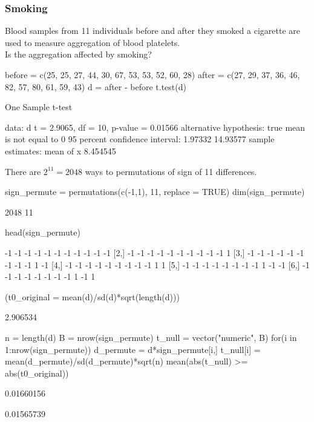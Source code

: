 \documentclass[a4paper]{article}
\begin{document}
\subsubsection{Smoking}
Blood samples from 11 individuals before and after they smoked a cigarette are used to measure aggregation of blood platelets.\\
Is the aggregation affected by smoking?
\begin{Schunk}
\begin{Sinput}
before = c(25, 25, 27, 44, 30, 67, 53, 53, 52, 60, 28)
after =  c(27, 29, 37, 36, 46, 82, 57, 80, 61, 59, 43)  
d = after - before
t.test(d)
\end{Sinput}
\begin{Soutput}

	One Sample t-test

data:  d
t = 2.9065, df = 10, p-value = 0.01566
alternative hypothesis: true mean is not equal to 0
95 percent confidence interval:
  1.97332 14.93577
sample estimates:
mean of x 
 8.454545 
\end{Soutput}
\end{Schunk}
There are \( 2^{11} = 2048 \) ways to permutations of sign of 11 differences.
\begin{Schunk}
\begin{Sinput}
sign_permute = permutations(c(-1,1), 11, replace = TRUE)
dim(sign_permute)
\end{Sinput}
\begin{Soutput}
[1] 2048   11
\end{Soutput}
\begin{Sinput}
head(sign_permute)
\end{Sinput}
\begin{Soutput}
     [,1] [,2] [,3] [,4] [,5] [,6] [,7] [,8] [,9] [,10] [,11]
[1,]   -1   -1   -1   -1   -1   -1   -1   -1   -1    -1    -1
[2,]   -1   -1   -1   -1   -1   -1   -1   -1   -1    -1     1
[3,]   -1   -1   -1   -1   -1   -1   -1   -1   -1     1    -1
[4,]   -1   -1   -1   -1   -1   -1   -1   -1   -1     1     1
[5,]   -1   -1   -1   -1   -1   -1   -1   -1    1    -1    -1
[6,]   -1   -1   -1   -1   -1   -1   -1   -1    1    -1     1
\end{Soutput}
\begin{Sinput}
(t0_original = mean(d)/sd(d)*sqrt(length(d)))
\end{Sinput}
\begin{Soutput}
[1] 2.906534
\end{Soutput}
\begin{Sinput}
n = length(d)
B = nrow(sign_permute)
t_null = vector("numeric", B)
for(i in 1:nrow(sign_permute)){
  d_permute = d*sign_permute[i,]
  t_null[i] = mean(d_permute)/sd(d_permute)*sqrt(n)
}
mean(abs(t_null) >= abs(t0_original))
\end{Sinput}
\begin{Soutput}
[1] 0.01660156
\end{Soutput}
\begin{Soutput}
[1] 0.01565739
\end{Soutput}
\end{Schunk}
\end{document}
